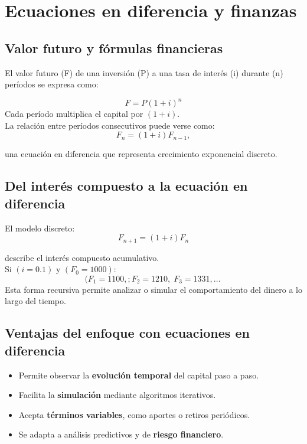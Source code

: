 \documentclass[
  letterpaper,
  DIV=11,
  numbers=noendperiod]{scrreprt}
\providecommand{\tightlist}{%
  \setlength{\itemsep}{0pt}\setlength{\parskip}{0pt}}
\begin{document}
\chapter{Ecuaciones en diferencia y
finanzas}\label{ecuaciones-en-diferencia-y-finanzas}

\section{Valor futuro y fórmulas
financieras}\label{valor-futuro-y-fuxf3rmulas-financieras}

El valor futuro (F) de una inversión (P) a una tasa de interés (i)
durante (n) períodos se expresa como:

\[
F=P(1+i)^n
\] Cada período multiplica el capital por \((1+i)\).\\
La relación entre períodos consecutivos puede verse como: \[
F_n = (1+i)F_{n-1},
\]

una ecuación en diferencia que representa crecimiento exponencial
discreto.

\section{Del interés compuesto a la ecuación en
diferencia}\label{del-interuxe9s-compuesto-a-la-ecuaciuxf3n-en-diferencia}

El modelo discreto: \[
F_{n+1} = (1+i)F_n
\]

describe el interés compuesto acumulativo.\\
Si \((i = 0.1)\) y \((F_0 = 1000)\):\\
\[
(F_1 = 1100,; F_2 = 1210,\; F_3 = 1331, \dots\
\] Esta forma recursiva permite analizar o simular el comportamiento del
dinero a lo largo del tiempo.

\section{Ventajas del enfoque con ecuaciones en
diferencia}\label{ventajas-del-enfoque-con-ecuaciones-en-diferencia}

\begin{itemize}
\tightlist
\item
  Permite observar la \textbf{evolución temporal} del capital paso a
  paso.\\
\item
  Facilita la \textbf{simulación} mediante algoritmos iterativos.\\
\item
  Acepta \textbf{términos variables}, como aportes o retiros
  periódicos.\\
\item
  Se adapta a análisis predictivos y de \textbf{riesgo financiero}.
\end{itemize}
\end{document}
